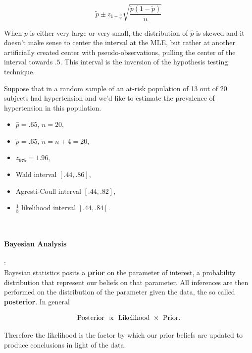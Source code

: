 \documentclass{homework}
\begin{document}
$$
\tilde{p} \pm  z_{1-\frac{\alpha}{2}} \sqrt{\frac{\tilde{p}(1-\tilde{p})}{n}}
$$

When $p$ is either very large or very small, the distribution of $\hat{p}$ is skewed and it doesn't make sense to center the interval at the MLE, but rather at another artificially created center with pseudo-observations, pulling the center of the interval towards $.5$. This interval is the inversion of the hypothesis testing technique. \\

\begin{tcolorbox}[title= Binomial proportions example:]

Suppose that in a random sample of an at-risk population of 13 out of 20 subjects had hypertension and we'd like to estimate the prevalence of hypertension in this population. 

\begin{itemize}
    \item $\hat{p}=.65$, $n=20$,
    \item $\tilde{p}=.65$, $\tilde{n}=n+4=20$,
    \item $z_{975} = 1.96$, 
    \item Wald interval $[.44, .86]$,
    \item Agresti-Coull interval $[.44, .82]$,
    \item $\frac{1}{8}$ likelihood interval $[.44, .84]$.
\end{itemize}
\end{tcolorbox}

\textnormal{ } \\

\paragraph{\textbf{Bayesian Analysis}}: \\

Bayesian statistics posits a \textbf{prior} on the parameter of interest, a probability distribution that represent our beliefs on that parameter. All inferences are then performed on the distribution of the parameter given the data, the so called \textbf{posterior}. In general

$$
\textnormal{Posterior } \propto \textnormal{ Likelihood  }\times \textnormal{ Prior}. 
$$

Therefore the likelihood is the factor by which our prior beliefs are updated to produce conclusions in light of the data. \\
\end{document}
